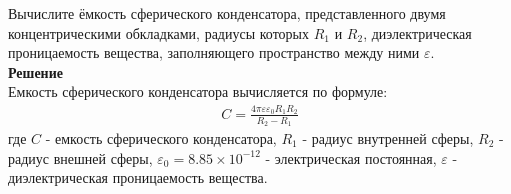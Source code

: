 \documentclass[__main__.tex]{subfiles}
\begin{document}
	
	Вычислите ёмкость сферического конденсатора, представленного двумя концентрическими обкладками, радиусы которых $R_1$ и $R_2$, диэлектрическая проницаемость вещества, заполняющего пространство между ними $\varepsilon$.\\ 
	
	\textbf{Решение}\\
	Емкость сферического конденсатора вычисляется по формуле:
	\begin{gather*}
		C = \frac{4\pi\varepsilon\varepsilon_0 R_1 R_2}{R_2-R_1}
	\end{gather*}
	где $C$ - емкость сферического конденсатора, $R_1$ - радиус внутренней сферы, $R_2$ - радиус внешней сферы, $\varepsilon_0 = 8.85\times 10^{-12}$ - электрическая постоянная, $\varepsilon$ - диэлектрическая проницаемость вещества.
	
\end{document}
